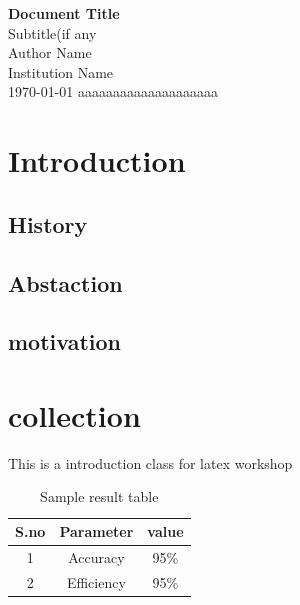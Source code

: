 \documentclass[12pt]{report}
\begin{document}
\begin{titlepage}
\centering
\vspace*{2cm}
{\LARGE \textbf {Document Title}}\\[1cm]
{\large Subtitle(if any}\\[2cm]
{\large Author Name} \\ [0.5cm]
{\large Institution Name} \\[0.5cm]
{\large \today }
\tableofcontents
\clearpage
aaaaaaaaaaaaaaaaaaaa

\end{titlepage}
\chapter{Introduction}
\section{History}
\section{Abstaction}
\section{motivation}
\chapter{collection}

\par This is a introduction class for latex workshop
\begin{table}[]
    \centering
    \caption{Sample result table}
    \label{tab : result}
    \begin{tabular}{|c|c|c|}
    \hline
    \textbf{S.no} & \textbf{Parameter} & \textbf{value}\\
    \hline
    1 & Accuracy & 95\% \\
    \hline
    2 & Efficiency & 95\% \\
    \hline
    \end{tabular}

\end{table}
\end{document}
